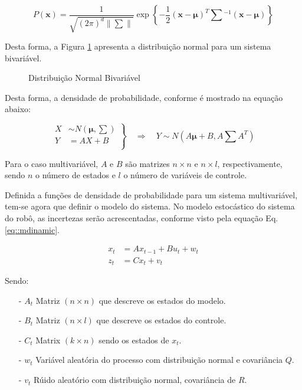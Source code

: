 \begin{equation}
    \label{eq::linearNd}
    P(\mathbf{x}) = \frac{1}{\sqrt{(2\pi)^d\|\textstyle\sum\|}}\exp\left\{-\frac{1}{2} (\mathbf{x}-\boldsymbol\mu)^T\textstyle\sum{}^{-1}(\mathbf{x}-\boldsymbol\mu)\right\}
\end{equation}

Desta forma, a Figura \ref{fig::gauss2} apresenta a distribuição normal para um sistema bivariável.


\begin{figure}[!ht]
    \centering
    
    \caption{Distribuição Normal Bivariável}
    \label{fig::gauss2}
\end{figure}

Desta forma, a densidade de probabilidade, conforme é mostrado na equação abaixo:

\begin{equation}
    \left.
    \begin{aligned}
            X & \sim N\left(\boldsymbol\mu, \textstyle\sum\right)\\
            Y & = {A}X + {B}\\
    \end{aligned} \right\}
    \quad \Rightarrow \quad Y \sim N\left( {A}\boldsymbol\mu+B, {A}\textstyle\sum {A}^T \right)
\end{equation}

Para o caso multivariável, ${A}$ e ${B}$ são matrizes $n \times n$ e $n \times l$, respectivamente, sendo $n$ o número de estados e $l$ o número de variáveis de controle.

Definida a funções de densidade de probabilidade para um sistema multivariável, tem-se agora que definir o modelo do sistema.
No modelo estocástico do sistema do robô, as incertezas serão acrescentadas, conforme visto pela equação Eq. \ref{eq::mdinamic}.

    \begin{equation} 
        \label{eq::mdinamic}
        \begin{aligned}
            x_t &= {A} x_{t-1} + {B} u_t +  w_t\\ 
        z_t &= {C} x_t + v_t
        \end{aligned}
        \end{equation}

    Sendo: 

    \begin{itemize}
        \item[-] ${A}_t$ Matriz $(n \times n)$ que descreve os estados do modelo.
        \item[-] ${B}_t$ Matriz $(n \times l)$ que descreve os estados do controle.
        \item[-] ${C}_t$ Matrix $(k\times n)$ sendo os estados de $x_t$.
        \item[-] $w_t$ Variável aleatória do processo com distribuição normal e covariância ${Q}$.
        \item[-] $v_t$ Rúido aleatório com distribuição normal, covariância de ${R}$.
    \end{itemize}


